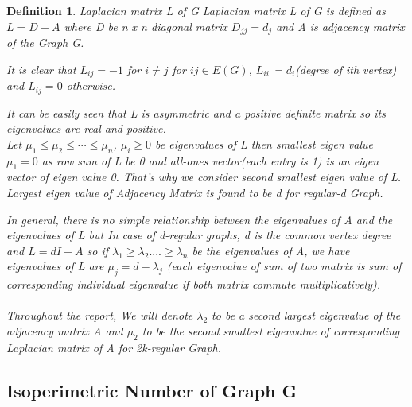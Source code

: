 \documentclass[oneside]{book}
\newtheorem{mydef}{Definition}
\begin{document}
\begin{mydef}
     
     {Laplacian matrix L of G }
     \label{ss:22}
      Laplacian matrix L of G is defined as  $L = D - A$ where  D be n x n diagonal matrix $D_{jj} = d_{j}$ and A is adjacency matrix of the Graph G.\par
      
          
            
          It is clear that   $L_{ij} = -1$ for $i\neq j$  for $ij\in E(G)$,  $L_{ii}$ = $d_i$(degree of ith vertex) and   $L_{ij} = 0$ otherwise.\par
          
          It can be easily seen that L is asymmetric and a positive definite  matrix so its eigenvalues are real and positive. \\
         
          Let $\mu_{1} \leq \mu_{2} \leq \cdots \leq \mu_{n}$, $\mu_{i} \geq 0$  be  eigenvalues of L then smallest eigen value $\mu_{1} = 0$ as row sum of L  be 0 and all-ones vector(each entry is 1) is an eigen vector of eigen value 0. That's why we consider second smallest eigen value of L. Largest eigen value of Adjacency Matrix is found to be d for regular-d Graph. \par
          
          
            
         
In general, there is no simple relationship between the eigenvalues of
A and the eigenvalues of L but In case of d-regular graphs, d is the
common vertex degree and $L = dI - A$  so if $\lambda_{1} \geq \lambda_{2}....\geq \lambda_{n}$  be the eigenvalues of A, we have eigenvalues of L are $\mu_{j} = d - \lambda_{j}$ (each eigenvalue of sum of two matrix is sum of corresponding  individual eigenvalue if both matrix commute multiplicatively). \\\\
Throughout the report, We will denote $\lambda_{2} $ to be a second largest eigenvalue of the adjacency matrix A and $\mu_{2}$ to be the second smallest eigenvalue of corresponding Laplacian matrix of A for 2k-regular Graph.  
          
           
         
           \subsection{Isoperimetric Number of Graph G} \label{ss:23}
           

\end{mydef}
\end{document}
